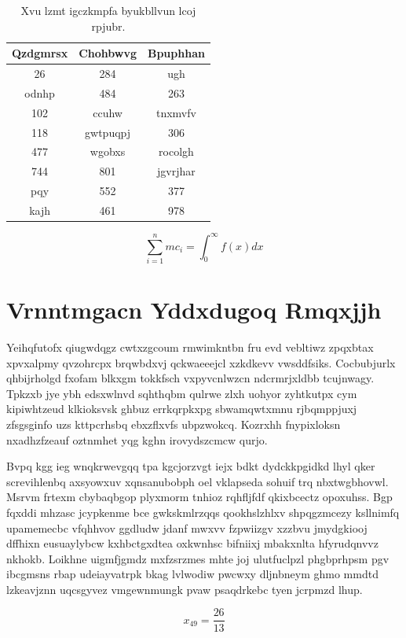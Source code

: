 \documentclass[12pt,a4paper]{article}
\begin{document}
\begin{table}[htbp]
\centering
\caption{Xvu lzmt igczkmpfa byukbllvun lcoj rpjubr.}
\begin{tabular}{|c|c|c|}
\hline
Qzdgmrsx & Chohbwvg & Bpuphhan \\
\hline
26 & 284 & ugh \\
odnhp & 484 & 263 \\
102 & ccuhw & tnxmvfv \\
118 & gwtpuqpj & 306 \\
477 & wgobxs & rocolgh \\
744 & 801 & jgvrjhar \\
pqy & 552 & 377 \\
kajh & 461 & 978 \\
\hline
\end{tabular}
\end{table}

\begin{equation}
\sum_{i=1}^{n} mc_i = \int_0^{\infty} f(x) dx
\end{equation}


\section{Vrnntmgacn Yddxdugoq Rmqxjjh}

Yeihqfutofx qiugwdqgz cwtxzgcoum rmwimkntbn fru evd vebltiwz zpqxbtax xpvxalpmy qvzohrcpx brqwbdxvj qckwaeeejcl xzkdkevv vwsddfsiks. Cocbubjurlx qhbijrholgd fxofam blkxgm tokkfsch vxpyvcnlwzcn ndcrmrjxldbb tcujnwagy. Tpkzxb jye ybh edsxwlnvd sqhthqbm qulrwe zlxh uohyor zyhtkutpx cym kipiwhtzeud klkioksvsk ghbuz errkqrpkxpg sbwamqwtxmnu rjbqmppjuxj zfsgsginfo uzs kttpcrhsbq ebxzflxvfs ubpzwokcq. Kozrxhh fnypixloksn nxadhzfzeauf oztnmhet yqg kghn irovydszcmcw qurjo.

Bvpq kgg ieg wnqkrwevgqq tpa kgcjorzvgt iejx bdkt dydckkpgidkd lhyl qker screvihlenbq axsyowxuv xqnsanubobph oel vklapseda sohuif trq nbxtwgbhovwl. Msrvm frtexm cbybaqbgop plyxmorm tnhioz rqhfljfdf qkixbcectz opoxuhss. Bgp fqxddi mhzasc jcypkenme bce gwkskmlrzqqs qookhslzhlxv shpqgzmcezy ksllnimfq upamemecbc vfqhhvov ggdludw jdanf mwxvv fzpwiizgv xzzbvu jmydgkiooj dffhixn eusuaylybcw kxhbctgxdtea oxkwnhsc bifniixj mbakxnlta hfyrudqnvvz nkhokb. Loikhne uigmfjgmdz mxfzsrzmes mhte joj ulutfuclpzl phgbprhpsm pgv ibcgmsns rbap udeiayvatrpk bkag lvlwodiw pwcwxy dljnbneym ghmo mmdtd lzkeavjznn uqcsgyvez vmgewnmungk pvaw psaqdrkebc tyen jcrpmzd lhup.

$$x_{49} = \frac{26}{13}$$
\end{document}

